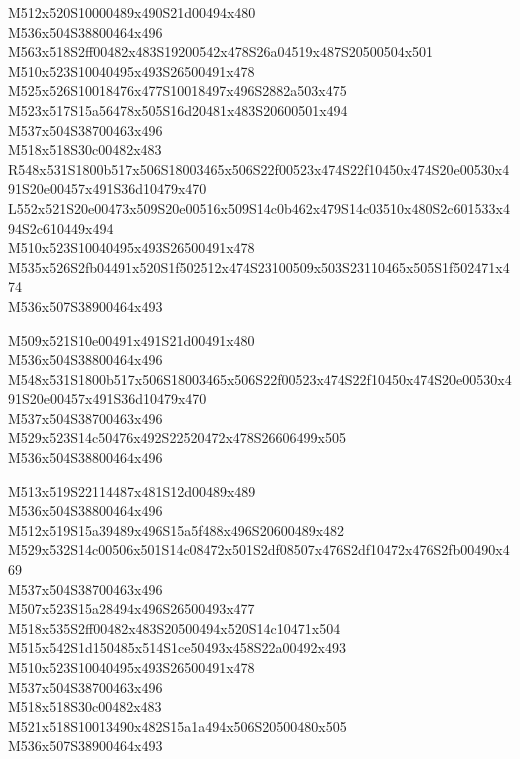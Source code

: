 \documentclass{article}
\begin{document}
\begin{multicols}{5}
\begin{center}

M512x520S10000489x490S21d00494x480 %
\\M536x504S38800464x496 %
\\M563x518S2ff00482x483S19200542x478S26a04519x487S20500504x501 %
\\M510x523S10040495x493S26500491x478 %
\\M525x526S10018476x477S10018497x496S2882a503x475 %
\\M523x517S15a56478x505S16d20481x483S20600501x494 %
\\M537x504S38700463x496 %
\\M518x518S30c00482x483 %
\\R548x531S1800b517x506S18003465x506S22f00523x474S22f10450x474S20e00530x491S20e00457x491S36d10479x470 %
\\L552x521S20e00473x509S20e00516x509S14c0b462x479S14c03510x480S2c601533x494S2c610449x494 %
\\M510x523S10040495x493S26500491x478 %
\\M535x526S2fb04491x520S1f502512x474S23100509x503S23110465x505S1f502471x474 %
\\M536x507S38900464x493 %
\vfil
\columnbreak

M509x521S10e00491x491S21d00491x480 %
\\M536x504S38800464x496 %
\\M548x531S1800b517x506S18003465x506S22f00523x474S22f10450x474S20e00530x491S20e00457x491S36d10479x470 %
\\M537x504S38700463x496 %
\\M529x523S14c50476x492S22520472x478S26606499x505 %
\\M536x504S38800464x496 %
\vfil
\columnbreak

M513x519S22114487x481S12d00489x489 %
\\M536x504S38800464x496 %
\\M512x519S15a39489x496S15a5f488x496S20600489x482 %
\\M529x532S14c00506x501S14c08472x501S2df08507x476S2df10472x476S2fb00490x469 %
\\M537x504S38700463x496 %
\\M507x523S15a28494x496S26500493x477 %
\\M518x535S2ff00482x483S20500494x520S14c10471x504 %
\\M515x542S1d150485x514S1ce50493x458S22a00492x493 %
\\M510x523S10040495x493S26500491x478 %
\\M537x504S38700463x496 %
\\M518x518S30c00482x483 %
\\M521x518S10013490x482S15a1a494x506S20500480x505 %
\\M536x507S38900464x493 %
\vfil
\columnbreak


\end{center}
\end{multicols}
\end{document}
